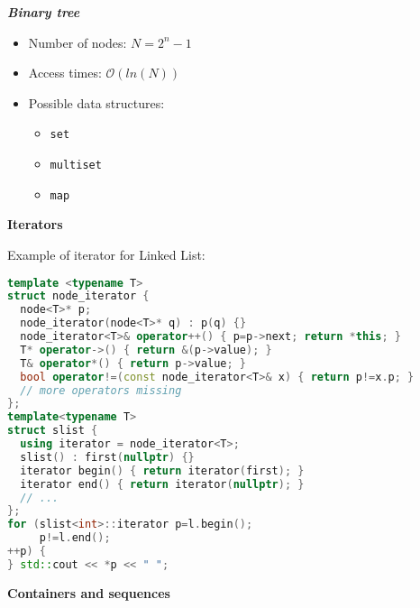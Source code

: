 \documentclass[fontsize=8pt, a4paper, landscape, fleqn]{scrartcl}
\renewcommand{\subsection}[1]{%
    \noindent\colorbox{subsectioncolor}{%
        \parbox{\dimexpr\columnwidth-2\fboxsep}{\color{white}\textbf{#1}}}%
    \vspace{0.5mm}%
}
\renewcommand{\subsubsection}[1]{%
    \noindent\textbf{\textit{\color{subsectioncolor}#1}}%
    \vspace{1mm}%
}
\begin{document}
\begin{multicols*}{3}[\raggedcolumns]
	\subsubsection{Binary tree}
    \begin{multicols}{2}
    \begin{itemize}
        \item Number of nodes: $N=2^n-1$
        \item Access times: $\mathcal{O}(ln(N))$
        \item Possible data structures:  
        \begin{itemize}
            \item \lstinline{set}  
            \item \lstinline{multiset}
            \item \lstinline{map}  
        \end{itemize}
    \end{itemize}
    \end{multicols}

	\subsection{Iterators}
    Example of iterator for Linked List:
    \begin{lstlisting}[language=C++, breaklines, emph={typedef}, emphstyle={\color{red}}]
template <typename T>
struct node_iterator {
  node<T>* p;
  node_iterator(node<T>* q) : p(q) {}
  node_iterator<T>& operator++() { p=p->next; return *this; }
  T* operator->() { return &(p->value); }
  T& operator*() { return p->value; }
  bool operator!=(const node_iterator<T>& x) { return p!=x.p; }
  // more operators missing
};
template<typename T>
struct slist {
  using iterator = node_iterator<T>;
  slist() : first(nullptr) {}
  iterator begin() { return iterator(first); }
  iterator end() { return iterator(nullptr); }
  // ...
};
for (slist<int>::iterator p=l.begin();
     p!=l.end();
++p) {
} std::cout << *p << " "; \end{lstlisting}

	\subsection{Containers and sequences}

\end{multicols*}
\end{document}

